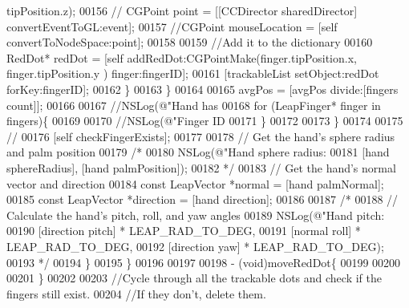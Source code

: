 \begin{DoxyCode}
{{      tipPosition.z);
00156                    \textcolor{comment}{// CGPoint point = [[CCDirector sharedDirector] convertEventToGL:event];}
00157                     \textcolor{comment}{//CGPoint mouseLocation = [self convertToNodeSpace:point];}
00158                 
00159                     \textcolor{comment}{//Add it to the dictionary}
00160                     RedDot* redDot = [\textcolor{keyword}{self} addRedDot:CGPointMake(finger.tipPosition.x, finger.tipPosition.y
      ) finger:fingerID];
00161                     [trackableList setObject:redDot forKey:fingerID];
00162                 \}
00163             \}
00164             
00165             avgPos = [avgPos divide:[fingers count]];
00166             
00167             \textcolor{comment}{//NSLog(@"Hand has %
00168             \textcolor{keywordflow}{for} (LeapFinger* finger in fingers)\{
00169                 
00170                 \textcolor{comment}{//NSLog(@"Finger ID %
00171             \}
00172             
00173         \}
00174         
00175         \textcolor{comment}{//}
00176         [\textcolor{keyword}{self} checkFingerExists];
00177         
00178         \textcolor{comment}{// Get the hand's sphere radius and palm position}
00179         \textcolor{comment}{/*}
00180 \textcolor{comment}{        NSLog(@"Hand sphere radius: %
00181 \textcolor{comment}{              [hand sphereRadius], [hand palmPosition]);}
00182 \textcolor{comment}{        */}
00183         \textcolor{comment}{// Get the hand's normal vector and direction}
00184         \textcolor{keyword}{const} LeapVector *normal = [hand palmNormal];
00185         \textcolor{keyword}{const} LeapVector *direction = [hand direction];
00186         
00187         \textcolor{comment}{/*}
00188 \textcolor{comment}{        // Calculate the hand's pitch, roll, and yaw angles}
00189 \textcolor{comment}{        NSLog(@"Hand pitch: %
00190 \textcolor{comment}{              [direction pitch] * LEAP\_RAD\_TO\_DEG,}
00191 \textcolor{comment}{              [normal roll] * LEAP\_RAD\_TO\_DEG,}
00192 \textcolor{comment}{              [direction yaw] * LEAP\_RAD\_TO\_DEG);}
00193 \textcolor{comment}{         */}
00194     \}
00195 \}
00196 
00197 
00198 - (void)moveRedDot\{
00199     
00200 
00201 \}
00202 
00203 \textcolor{comment}{//Cycle through all the trackable dots and check if the fingers still exist.}
00204 \textcolor{comment}{//If they don't, delete them.}
}}}}}}
\end{DoxyCode}

